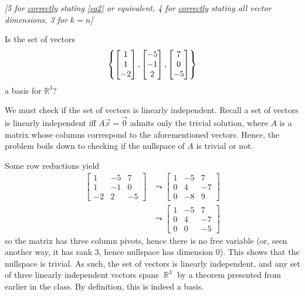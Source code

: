 \documentclass[answers,11pt]{exam}
\theoremstyle{definition}
\DeclareMathOperator{\R}{\mathbb{R}}
\DeclareMathOperator{\1}{\mathbbm{1}}
\begin{document}
\begin{questions}
\begin{parts}
\begin{solution}
	\textit{[5 for \uline{correctly} stating \eqref{eq2} or equivalent, 4 for \uline{correctly} stating all vector dimensions, 3 for $k=n$]}
\end{solution}

\end{parts}
\addpoints

\question[25] Is the set of vectors 
\begin{equation*}
\set{ \begin{bmatrix}
1\\
1\\
-2
\end{bmatrix},
\begin{bmatrix}
-5\\
-1\\
2
\end{bmatrix},
\begin{bmatrix}
7\\
0\\
-5
\end{bmatrix} }
\end{equation*}
a basis for $\mathbb{R}^3$?
\addpoints

\begin{solution}
	We must check if the set of vectors is linearly independent. Recall a set of vectors is linearly independent iff $A \vec{x} = \vec{0}$ admits only the trivial solution, where $A$ is a matrix whose columns correspond to the aforementioned vectors. Hence, the problem boils down to checking if the nullspace of $A$ is trivial or not.
	
	Some row reductions yield
	\begin{align*}
	\begin{bmatrix}
	1 & -5 & 7 \\ 1 & -1 & 0 \\ -2 & 2 & -5
	\end{bmatrix} & \leadsto \begin{bmatrix}
	1 & -5 & 7 \\ 0 & 4 & -7 \\ 0 & -8 & 9
	\end{bmatrix} \\
	&\leadsto \begin{bmatrix}
	1 & -5 & 7 \\ 0 & 4 & -7 \\ 0 & 0 & -5
	\end{bmatrix}
	\end{align*}
	so the matrix has three column pivots, hence there is no free variable (or, seen another way, it has rank 3, hence nullspace has dimension 0). This shows that the nullspace is trivial. As such, the set of vectors is linearly independent, and any set of three linearly independent vectors spans $\R^3$ by a theorem presented from earlier in the class. By definition, this is indeed a basis.
	

\end{solution}
\end{questions}
\end{document}
